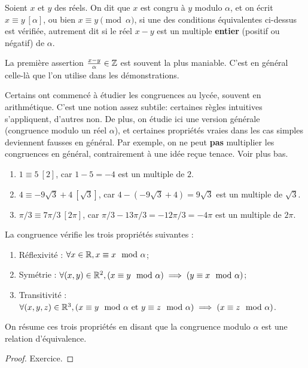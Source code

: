 \begin{definition}
Soient $x$ et $y$ des réels.
On dit que $x$ est congru à $y$ modulo $\alpha$, et on écrit $x\equiv y~[\alpha]$, ou bien $x\equiv y \pmod \alpha$, si une des conditions équivalentes ci-dessus est vérifiée, autrement dit si le réel $x-y$ est un multiple \textbf{entier} (positif ou négatif) de $\alpha$.
\end{definition}

\begin{remarque}
La première assertion $\frac{x-y}{\alpha} \in\mathbb{Z}$ est souvent la plus maniable. C'est en général celle-là que l'on utilise dans les démonstrations.
\end{remarque}

\begin{attention}
Certains ont commencé à étudier les congruences au lycée, souvent en arithmétique. C'est une notion assez subtile: certaines règles intuitives s'appliquent, d'autres non. De plus, on étudie ici une version générale (congruence modulo un réel $\alpha$), et certaines propriétés vraies dans les cas simples deviennent fausses en général. Par exemple, on ne peut \textbf{pas} multiplier les congruences en général, contrairement à une idée reçue tenace. Voir plus bas. 
\end{attention}

\begin{exemples}
\begin{enumerate}
\item $1 \equiv 5~[2]$, car $1-5 = -4$ est un multiple de $2$.
\item $4\equiv -9\sqrt{3}+4~[\sqrt{3}]$, car $4 - (-9\sqrt{3}+4) = 9\sqrt{3}$ est un multiple de $\sqrt{3}$.
\item $\pi/3 \equiv 7\pi/3~[2\pi]$, car $\pi/3 - 13\pi/3 = -12\pi/3 = -4\pi$ est un multiple de $2\pi$.
\end{enumerate}
\end{exemples}



\begin{proposition}
La congruence vérifie les trois propriétés suivantes : 
\begin{enumerate}
\item Réflexivité : $\forall x\in\mathbb{R}, x\equiv x\mod \alpha$;\\
\item Symétrie : $\forall (x,y)\in\mathbb{R}^2, (x\equiv y \mod \alpha)\implies (y\equiv x \mod \alpha)$;\\
\item Transitivité : $\forall (x,y,z)\in\mathbb{R}^3, (x\equiv y\mod \alpha\text{ et }y\equiv z\mod \alpha)\implies (x\equiv z\mod \alpha)$.
\end{enumerate}
On résume ces trois propriétés en disant que la congruence modulo $\alpha$ est une relation d'équivalence. 
 \end{proposition}
 \begin{proof}
Exercice.
 \end{proof}


